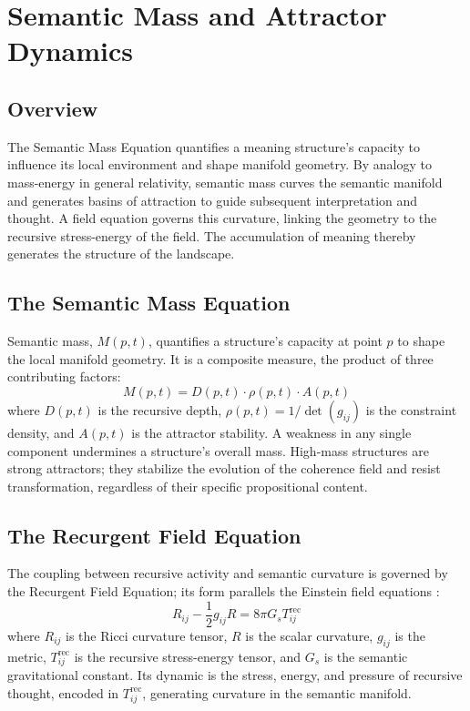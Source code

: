 \chapter{Semantic Mass and Attractor Dynamics}

\section{Overview}

The Semantic Mass Equation quantifies a meaning structure's capacity to influence its local environment and shape manifold geometry. By analogy to mass-energy in general relativity, semantic mass curves the semantic manifold and generates basins of attraction to guide subsequent interpretation and thought. A field equation governs this curvature, linking the geometry to the recursive stress-energy of the field. The accumulation of meaning thereby generates the structure of the landscape.

\section{The Semantic Mass Equation}

Semantic mass, \(M(p,t)\), quantifies a structure's capacity at point \(p\) to shape the local manifold geometry. It is a composite measure, the product of three contributing factors:
\begin{equation}
M(p, t) = D(p, t) \cdot \rho(p, t) \cdot A(p, t)
\end{equation}
where \(D(p, t)\) is the recursive depth, \(\rho(p, t) = 1/\det(g_{ij})\) is the constraint density, and \(A(p, t)\) is the attractor stability. A weakness in any single component undermines a structure's overall mass. High-mass structures are strong attractors; they stabilize the evolution of the coherence field and resist transformation, regardless of their specific propositional content.

\section{The Recurgent Field Equation}

The coupling between recursive activity and semantic curvature is governed by the Recurgent Field Equation; its form parallels the Einstein field equations \autocite{Einstein1915, MisnerThorneWheeler1973, Wald1984}:
\begin{equation}
R_{ij} - \frac{1}{2}g_{ij}R = 8\pi G_s T^{\text{rec}}_{ij}
\end{equation}
where \(R_{ij}\) is the Ricci curvature tensor, \(R\) is the scalar curvature, \(g_{ij}\) is the metric, \(T^{\text{rec}}_{ij}\) is the recursive stress-energy tensor, and \(G_s\) is the semantic gravitational constant. Its dynamic is the stress, energy, and pressure of recursive thought, encoded in \(T^{\text{rec}}_{ij}\), generating curvature in the semantic manifold.

